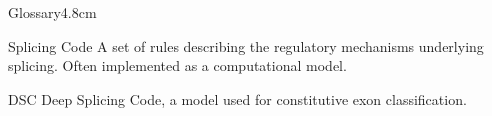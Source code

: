 \begin{mclistof}{Glossary}{4.8cm}
\item[Splicing Code] A set of rules describing the regulatory mechanisms underlying splicing. Often implemented as a computational model.
\item[DSC] Deep Splicing Code, a model used for constitutive exon classification.



\end{mclistof} 
